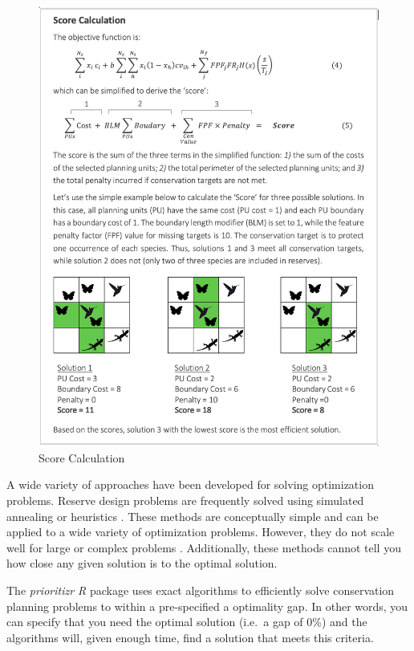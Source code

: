 \documentclass[
  12pt,
]{book}
\begin{document}
\begin{figure}

{\centering \includegraphics[width=1\linewidth]{images/Box} 

}

\caption{Score Calculation}\label{fig:Box}
\end{figure}

A wide variety of approaches have been developed for solving optimization problems. Reserve design problems are frequently solved using simulated annealing \citep{r6} or heuristics \citep{r8, r7}. These methods are conceptually simple and can be applied to a wide variety of optimization problems. However, they do not scale well for large or complex problems \citep{r1}. Additionally, these methods cannot tell you how close any given solution is to the optimal solution.

The \emph{prioritizr R} package uses exact algorithms to efficiently solve conservation planning problems to within a pre-specified a optimality gap. In other words, you can specify that you need the optimal solution (i.e.~a gap of 0\%) and the algorithms will, given enough time, find a solution that meets this criteria.
\end{document}
